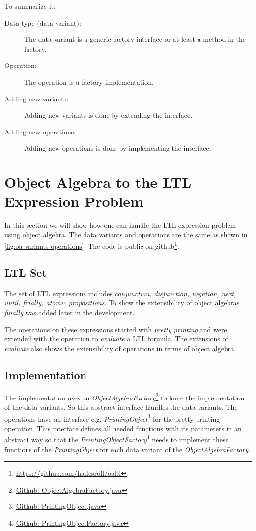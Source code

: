 \documentclass{llncs}
\begin{document}
To summarize it:

\begin{description}
	\item[Data type (data variant):] The data variant is a generic factory interface or at least a method in the factory.
	\item[Operation:] The operation is a factory implementation.
	\item[Adding new variants: ] Adding new variants is done by extending the interface.
	\item[Adding new operations:] Adding new operations is done by implementing the interface.
\end{description}


\section{Object Algebra to the LTL Expression Problem} \label{sec:oa-ltl}
In this section we will show how one can handle the LTL expression problem using object algebra. The data variants and operations are the same as shown in \autoref{fig:oa-variants-operations}. The code is public on github\footnote{\href{https://github.com/hadesrofl/oaltl}{https://github.com/hadesrofl/oaltl}}.

\subsection{LTL Set} \label{ssec:ltl-set}
The set of LTL expressions includes \emph{conjunction, disjunction, negation, next, until, finally, atomic propositions}. To show the extensibility of object algebras \emph{finally} was added later in the development.

The operations on these expressions started with \emph{pretty printing} and were extended with the operation to \emph{evaluate} a LTL formula. The extensions of \emph{evaluate} also shows the extensibility of operations in terms of object algebra.

\subsection{Implementation} \label{ssec:implementation}
The implementation uses an \emph{ObjectAlgebraFactory}\footnote{\href{https://github.com/hadesrofl/oaltl/blob/master/src/main/java/de/uzl/hsr/oaltl/ObjectAlgebraFactory.java}{Github: ObjectAlgebraFactory.java}} to force the implementation of the data variants. So this abstract interface handles the data variants. The operations have an interface e.g. \emph{PrintingObject}\footnote{\href{https://github.com/hadesrofl/oaltl/blob/master/src/main/java/de/uzl/hsr/oaltl/PrintingObject.java}{Github: PrintingObject.java}} for the pretty printing operation. This interface defines all needed functions with its parameters in an abstract way so that the \emph{PrintingObjectFactory}\footnote{\href{https://github.com/hadesrofl/oaltl/blob/master/src/main/java/de/uzl/hsr/oaltl/PrintingObjectFactory.java}{Github: PrintingObjectFactory.java}} needs to implement these functions of the \emph{PrintingObject} for each data variant of the \emph{ObjectAlgebraFactory}. 
\end{document}
